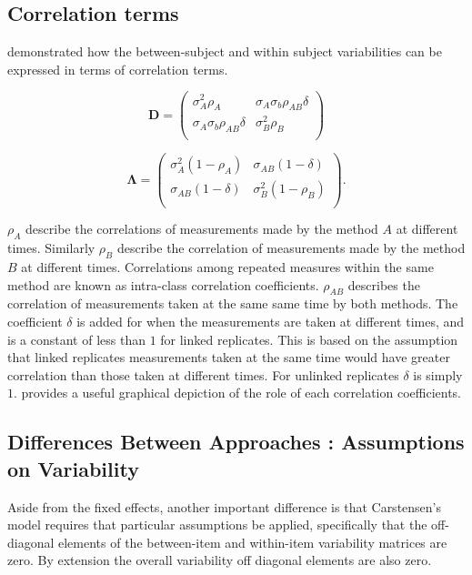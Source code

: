 \documentclass[12pt, a4paper]{report}
\theoremstyle{plain}
\theoremstyle{definition}
\theoremstyle{remark}
\begin{document}
\subsection{Correlation terms}
\citet{hamlett} demonstrated how the between-subject and within subject variabilities can be expressed in terms of
correlation terms.

\[
\boldsymbol{D} = \left( \begin{array}{cc}
\sigma^2_{A}\rho_{A} & \sigma_{A}\sigma_{b}\rho_{AB}\delta \\
\sigma_{A}\sigma_{b}\rho_{AB}\delta & \sigma^2_{B}\rho_{B}\\

\end{array}\right)
\]

\[
\boldsymbol{\Lambda} = \left(
\begin{array}{cc}
\sigma^2_{A}(1-\rho_{A}) & \sigma_{AB}(1-\delta)  \\
\sigma_{AB}(1-\delta) & \sigma^2_{B}(1-\rho_{B}) \\
\end{array}\right).
\]

$\rho_{A}$ describe the correlations of measurements made by the method $A$ at different times. Similarly $\rho_{B}$ describe the correlation of measurements made by the method $B$ at different times. Correlations among repeated measures within the same method are known as intra-class correlation coefficients. $\rho_{AB}$ describes the correlation of measurements taken at the same same time by both methods. The coefficient $\delta$ is added for when the measurements are taken at different times, and is a constant of less than $1$ for linked replicates. This is based on the assumption that linked replicates measurements taken at the same time would have greater correlation than those taken at different times. For unlinked replicates $\delta$ is simply $1$. \citet{hamlett} provides a useful graphical depiction of the role of each correlation coefficients.

\newpage



\subsection{Differences Between Approaches : Assumptions on Variability}
Aside from the fixed effects, another important difference is that Carstensen's model requires that particular assumptions be applied, specifically that the off-diagonal elements of the between-item
and within-item variability matrices are zero. By extension the
overall variability off diagonal elements are also zero.
\end{document}
